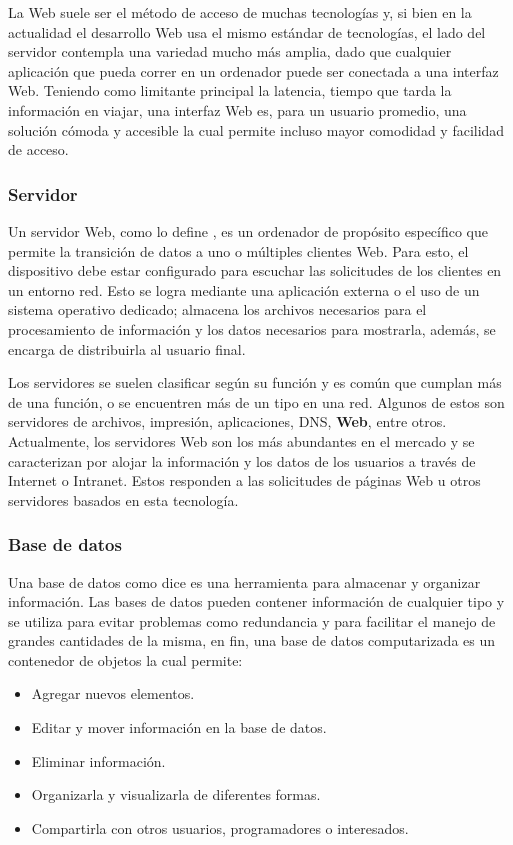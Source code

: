 La Web suele ser el método de acceso de muchas tecnologías y, si bien en la actualidad
el desarrollo Web usa el mismo estándar de tecnologías, el lado del servidor
contempla una variedad mucho más amplia, dado que cualquier aplicación que
pueda correr en un ordenador puede ser conectada a una interfaz Web. Teniendo
como limitante principal la latencia,  tiempo que tarda la información en viajar,
una interfaz Web es, para un usuario promedio, una solución cómoda y
accesible la cual  permite incluso  mayor comodidad y facilidad de acceso.


\subsubsection*{Servidor}

Un servidor Web, como lo define \textcite{servidor},  es un ordenador de propósito
específico que permite la
transición de datos a uno o múltiples clientes Web. Para esto, el dispositivo
debe estar configurado para escuchar las solicitudes de los clientes en un
entorno red. Esto se logra mediante una aplicación externa o el uso de un
sistema operativo dedicado; almacena los archivos
necesarios para el procesamiento de información y los datos necesarios para
mostrarla, además, se encarga de distribuirla al usuario final.

Los servidores se suelen clasificar según su función y es común que cumplan más
de una función, o se encuentren más de un tipo en una red. Algunos de estos son
servidores de archivos, impresión, aplicaciones, DNS, \textbf{Web}, entre otros.
Actualmente, los servidores Web son los más abundantes en el mercado
y se caracterizan por alojar la información y los datos de los usuarios a través
de Internet o Intranet. Estos responden a las solicitudes de páginas Web u otros
servidores basados en esta tecnología.

\subsubsection{Base de datos}
Una base de datos como dice \textcite{bbdd} es una herramienta para almacenar y
organizar información.
Las bases de datos pueden contener información de cualquier tipo
y se utiliza para evitar problemas como redundancia y para facilitar el manejo de
grandes cantidades de la misma, en fin,  una base de datos
computarizada es un contenedor de objetos la cual permite:

\begin{itemize}
    \item Agregar nuevos elementos.
    \item Editar y mover información en la base de datos.
    \item Eliminar información.
    \item Organizarla y visualizarla de diferentes formas.
    \item Compartirla con otros usuarios, programadores o interesados.
\end{itemize}

